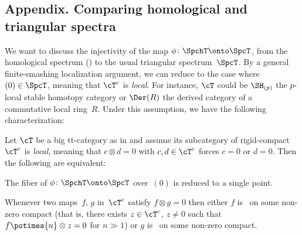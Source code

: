 \begin{appendix}
\section*{Appendix. Comparing homological and triangular spectra}
\label{App:hom-local}

We want to discuss the injectivity of the map $\phi\colon \SpchT\onto \SpcT$, from the homological spectrum () to the usual triangular spectrum~$\SpcT$. By a general finite-smashing localization argument, we can reduce to the case where $(0)\in \SpcT$, meaning that $\cT^c$ is \emph{local}. For instance, $\cT$ could be $\SH_{(p)}$ the $p$-local stable homotopy category or $\Der(R)$ the derived category of a commutative local ring~$R$. Under this assumption, we have the following characterization:

\begin{Thm}
\label{Thm:hom-local}
Let $\cT$ be a big tt-category as in  and assume its subcategory of rigid-compact~$\cT^c$ is \emph{local}, meaning that $c\otimes d=0$ with $c,d\in\cT^c$ forces $c=0$ or $d=0$. Then the following are equivalent:
\begin{enumeratei}
\item
\label{it:fiber=*}
The fiber of $\phi\colon \SpchT\onto \SpcT$ over~$(0)$ is reduced to a single point.

\item
\label{it:hom-local}
Whenever two maps~$f$, $g$ in~$\cT^c$ satisfy $f\otimes g=0$ then either $f$ is \tensnil\ on some non-zero compact (that is, there exists $z\in\cT^c$, $z\neq0$ such that $f\potimes{n}\otimes z=0$ for $n\gg1$) or $g$ is \tensnil\ on some non-zero compact.
\end{enumeratei}
\end{Thm}


\end{appendix}
